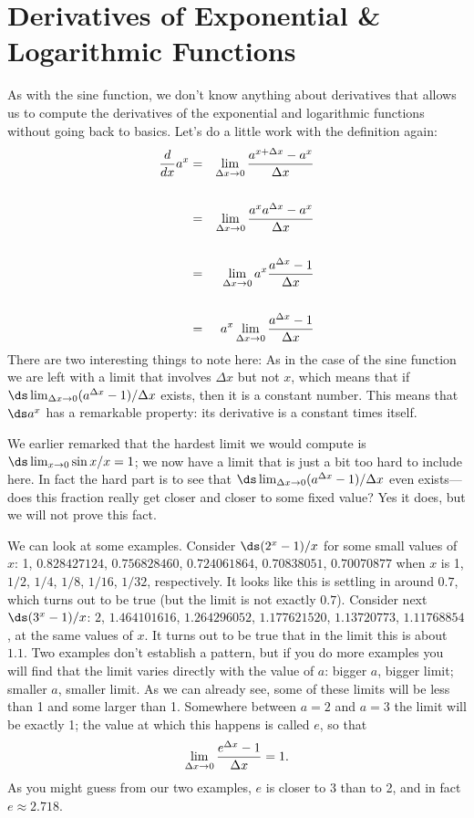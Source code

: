 \section{Derivatives of Exponential \& Logarithmic Functions}\label{sec:DerivativeExpLog}
As with the sine function, we don't know anything about derivatives that allows
us to compute the derivatives of the exponential and logarithmic
functions without going back to basics. Let's do a little work with
the definition again:
\begin{eqnarray*}
\frac{d}{dx}a^x&=&\lim_{\Delta x\to 0} \frac{a^{x+\Delta x}-a^x}{\Delta x}\cr
\\
&=&\lim_{\Delta x\to 0} \frac{a^xa^{\Delta x}-a^x}{\Delta x}\cr
\\
&=&\lim_{\Delta x\to 0} a^x\frac{a^{\Delta x}-1}{\Delta x}\cr
\\
&=&a^x\lim_{\Delta x\to 0} \frac{a^{\Delta x}-1}{\Delta x}\cr
\end{eqnarray*}
There are two interesting things to note here: As in the case of the
sine function we are left with a limit that involves $\Delta x$ but
not $x$, which means that if $\ds \lim_{\Delta x\to 0} (a^{\Delta x}-1)/\Delta x$ exists,
then it is a constant number. This means that $\ds a^x$ has a remarkable property: its
derivative is a constant times itself.

We earlier remarked that the hardest limit we would compute is
$\ds \lim_{x\to0}\sin x/x=1$; we now have a limit that is just a bit too
hard to include here. In fact the hard part is to see that
$\ds \lim_{\Delta x\to 0} (a^{\Delta x}-1)/\Delta x$ even exists---does this fraction really get closer
and closer to some fixed value? Yes it does, but we will not prove
this fact.
 
We can look at some examples. Consider $\ds (2^x-1)/x$ for some small
values of $x$: 1, $0.828427124$, $0.756828460$, $0.724061864$,
$0.70838051$, $0.70070877$ when $x$ is 1, $1/2$, $1/4$, $1/8$, $1/16$,
$1/32$, respectively. It looks like this is settling in around $0.7$,
which turns out to be true (but the limit is not exactly $0.7$).
Consider next $\ds (3^x-1)/x$: $2$,  $1.464101616$,
$1.264296052$, $1.177621520$, $1.13720773$, $1.11768854$, at the same
values of $x$. It turns out to be true that in the limit this
is about $1.1$. Two examples don't establish a pattern, but if you do
more examples you will find that the limit varies directly with the
value of $a$: bigger $a$, bigger limit; smaller $a$, smaller limit. As
we can already see, some of these limits will be less than 1 and some
larger than 1. Somewhere between $a=2$ and $a=3$ the limit will be
exactly 1; the value at which this happens is called $e$, so that
$$\lim_{\Delta x\to 0} {e^{\Delta x}-1\over \Delta x}=1.$$ As you
might guess from our two examples, $e$ is closer to 3 than to 2, and
in fact $e\approx 2.718$.

